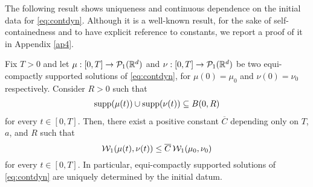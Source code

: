 

%


The following result shows uniqueness and continuous dependence on the initial data for \eqref{eq:contdyn}. Although it is a well-known result, for the sake of self-containedness and to have explicit reference to constants, we report a proof of it in Appendix \ref{ap4}.

\begin{theorem}\label{uniq}
Fix $T>0$  and let $\mu:[0,T]\rightarrow\mathcal{P}_1(\mathbb{R}^d)$ and $\nu:[0,T]\rightarrow\mathcal{P}_1(\mathbb{R}^d)$ be two equi-compactly supported solutions  of \eqref{eq:contdyn}, for $\mu(0)=\mu_0$ and $\nu(0)=\nu_0$ respectively. Consider $R>0$ such that
\begin{align}\label{supptot}
\operatorname{supp}(\mu(t))\cup\operatorname{supp}(\nu(t)) \subseteq B(0, R)
\end{align}
for every $t \in[0, T]$. Then, there exist a positive constant $\overline{C}$ depending only on $T$, $a$,  and $R$ such that
\begin{equation}\label{stab}
\mathcal{W}_1(\mu(t), \nu(t)) \le \overline{C} \, \mathcal{W}_1(\mu_0, \nu_0)
\end{equation}
for every $t \in [0, T]$. In particular, equi-compactly supported solutions of \eqref{eq:contdyn} are uniquely determined by the initial datum.
\end{theorem}
